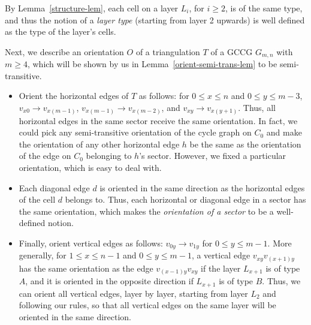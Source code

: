 \documentclass[12pt]{article}
\numberwithin{equation}{section}
\begin{document}
By Lemma~\ref{structure-lem}, each cell on a layer $L_i$, for $i\geq 2$, is of the same type, and thus the notion of a {\em layer type} (starting from layer 2 upwards) is well defined as the type of the layer's cells.

Next, we describe an orientation $O$ of a triangulation $T$ of a GCCG $G_{m,n}$ with $m\geq 4$, which will be shown by us in Lemma~\ref{orient-semi-trans-lem} to be semi-transitive.

\begin{itemize}
\item Orient the horizontal edges of $T$ as follows: for $0\leq x\leq n$ and $0\leq y\leq m-3$, $v_{x0}\rightarrow v_{x(m-1)}$, $v_{x(m-1)}\rightarrow v_{x(m-2)}$, and $v_{xy}\rightarrow v_{x(y+1)}$. Thus, all horizontal edges in the same sector receive the same orientation. In fact, we could pick any semi-transitive orientation of the cycle graph on $C_0$ and make the orientation of any other horizontal edge $h$ be the same as the orientation of the edge on $C_0$ belonging to $h$'s sector. However, we fixed a particular orientation, which is easy to deal with.
\item Each diagonal edge $d$ is oriented in the same direction as the horizontal edges of the cell $d$ belongs to. Thus, each horizontal or diagonal edge in a sector has the same orientation, which makes the {\em orientation of a sector} to be a well-defined notion.
\item Finally, orient vertical edges as follows: $v_{0y}\rightarrow v_{1y}$ for $0\leq y\leq m-1$. More generally, for $1\leq x\leq n-1$ and $0\leq y\leq m-1$, a vertical edge $v_{xy}v_{(x+1)y}$ has the same orientation as the edge  $v_{(x-1)y}v_{xy}$ if the layer $L_{x+1}$ is of type $A$, and it is oriented in the opposite direction if $L_{x+1}$ is of type $B$. Thus, we can orient all vertical edges, layer by layer, starting from layer $L_2$ and following our rules, so that all vertical edges on the same layer will be oriented in the same direction.
\end{itemize}
\end{document}
